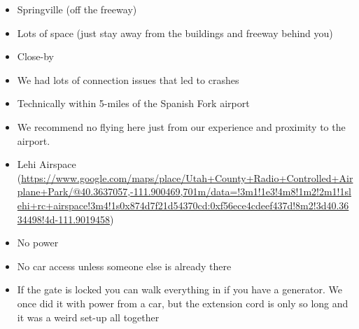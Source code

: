 \begin{itemize}
\tightlist
\item
  {Springville (off the freeway)}
\end{itemize}

\begin{itemize}
\tightlist
\item
  {Lots of space (just stay away from the buildings and freeway behind
  you)}
\item
  {Close-by}
\item
  {We had lots of connection issues that led to crashes}
\item
  {Technically within 5-miles of the Spanish Fork airport}
\item
  {We recommend no flying here just from our experience and proximity to
  the airport.}
\end{itemize}

\begin{itemize}
\tightlist
\item
  {Lehi Airspace
  (}{\href{https://www.google.com/url?q=https://www.google.com/maps/place/Utah\%2BCounty\%2BRadio\%2BControlled\%2BAirplane\%2BPark/@40.3637057,-111.900469,701m/data\%3D!3m1!1e3!4m8!1m2!2m1!1slehi\%2Brc\%2Bairspace!3m4!1s0x874d7f21d54370cd:0xf56ece4cdeef437d!8m2!3d40.3634498!4d-111.9019458\&sa=D\&ust=1564438983443000}{https://www.google.com/maps/place/Utah+County+Radio+Controlled+Airplane+Park/@40.3637057,-111.900469,701m/data=!3m1!1e3!4m8!1m2!2m1!1slehi+rc+airspace!3m4!1s0x874d7f21d54370cd:0xf56ece4cdeef437d!8m2!3d40.3634498!4d-111.9019458}}{)}
\end{itemize}

\begin{itemize}
\tightlist
\item
  {No power}
\item
  {No car access unless someone else is already there}
\end{itemize}

\begin{itemize}
\tightlist
\item
  {If the gate is locked you can walk everything in if you have a
  generator. We once did it with power from a car, but the extension
  cord is only so long and it was a weird set-up all together}
\end{itemize}

